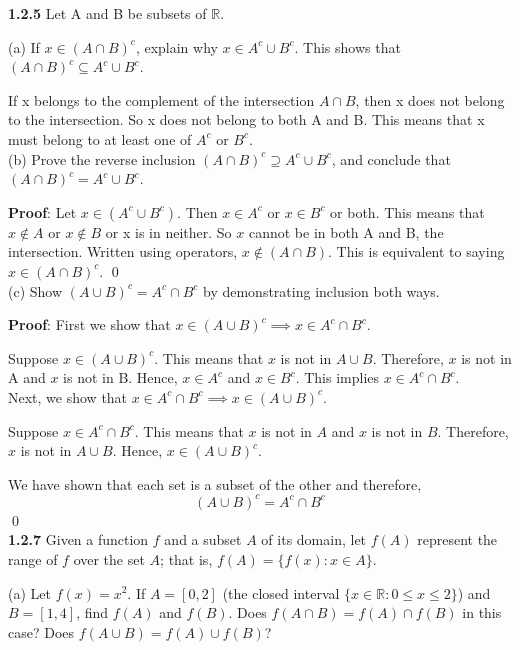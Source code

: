\documentclass{article}
\begin{document}
\noindent \textbf{1.2.5} 
Let A and B be subsets of $\mathbb{R}$.

(a) If $x \in (A \cap B)^c$, explain why $x \in A^c \cup B^c$. This shows that $(A \cap B)^c 	\subseteq A^c \cup B^c$.

If x belongs to the complement of the intersection $A \cap B$, then x does not belong to the intersection. So x does not belong to both A and B. This means that x must belong to at least one of $A^c$ or $B^c$. \\

(b) Prove the reverse inclusion $(A \cap B)^c \supseteq A^c \cup B^c$, and conclude that $(A \cap B)^c = A^c \cup B^c$.

\textbf{Proof}: Let $x \in (A^c \cup B^c)$. Then $x \in A^c$ or $x \in B^c$ or both. This means that $x \notin A$ or $x \notin B$ or x is in neither. So $x$ cannot be in both A and B, the intersection. Written using operators, $x \notin (A \cap B)$. This is equivalent to saying $x \in (A \cap B)^c$. \qed\\

(c) Show $(A \cup B)^c = A^c \cap B^c$ by demonstrating inclusion both ways.

\textbf{Proof}: First we show that $x \in (A \cup B)^c \implies x \in A^c \cap B^c$.

Suppose $x \in (A \cup B)^c$. This means that $x$ is not in $A \cup B$. Therefore, $x$ is not in A and $x$ is not in B. Hence, $x \in A^c $ and $x \in B^c$. This implies $x \in A^c \cap B^c$. \\


Next, we show that $x \in A^c \cap B^c \implies x \in (A \cup B)^c$.

Suppose $x \in A^c \cap B^c$. This means that $x$ is not in $A$ and $x$ is not in $B$. Therefore, $x$ is not in $A \cup B$. Hence, $x \in (A \cup B)^c $.

We have shown that each set is a subset of the other and therefore, $$ (A \cup B)^c = A^c \cap B^c $$ \qed\\



\noindent \textbf{1.2.7}
Given a function $f$ and a subset $A$ of its domain, let $f(A)$
represent the range of $f$ over the set $A$; that is, $f(A) = \{f(x) : x \in A\}$.

(a) Let $f(x) = x^2$. If $A = [0, 2]$ (the closed interval $\{x \in \mathbb{R} : 0 \leq x \leq 2\}$) and $B = [1, 4]$, find $f(A)$ and $f(B)$. Does $f(A \cap B) = f(A) \cap f(B)$ in this case? Does $f(A \cup B) = f(A) \cup f(B)$?
\end{document}
